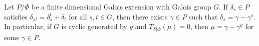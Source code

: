 Let $P/\Phi$ be a finite dimensional Galois extension with Galois group $G$. If $\delta_s \in P$ satisfies $\delta_{st} = \delta_s^t + \delta_t$ for all $s, t \in G$, then there exists $\gamma \in P$ such that $\delta_s = \gamma - \gamma^s$. In particular, if $G$ is cyclic generated by $g$ and $T_{P|\Phi}(\mu) = 0$, then $\mu = \gamma - \gamma^g$ for some $\gamma \in P$.
